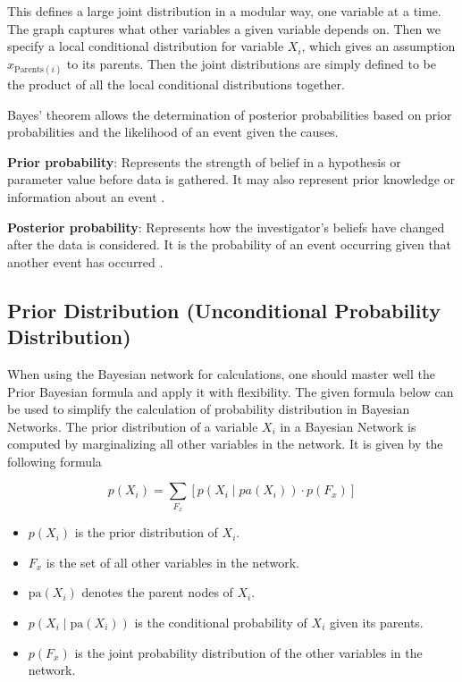 This defines a large joint distribution in a modular way, one variable at a time. The graph captures what other variables a given variable depends on. Then we specify a local conditional distribution for variable \( X_i \), which gives an assumption \( x_{\text{Parents}(i)} \) to its parents. Then the joint distributions are simply defined to be the product of all the local conditional distributions together. 

Bayes’ theorem allows the determination of posterior probabilities based on prior probabilities and the likelihood of an event given the causes.

\textbf{Prior probability}: Represents the strength of belief in a hypothesis or parameter value before data is gathered. It may also represent prior knowledge or information about an event \parencite{mikkola2024prior}.

\textbf{Posterior probability}: Represents how the investigator’s beliefs have changed after the data is considered. It is the probability of an event occurring given that another event has occurred \parencite{hart2022posterior}.

\subsection{Prior Distribution (Unconditional Probability Distribution) }
When using the Bayesian network for calculations, one should master well the Prior Bayesian formula and apply it with flexibility. The given formula below can be used to simplify the calculation of probability distribution in Bayesian Networks. The prior distribution of a variable \(X_i\) in a Bayesian Network is computed by marginalizing all other variables in the network. It is given by the following formula

\begin{equation}
p(X_i)=\sum_{F_x} \left[ p(X_i \mid pa(X_i)) \cdot p(F_x) \right]
\end{equation}
\begin{itemize}
    \item \( p(X_i) \) is the prior distribution of \( X_i \).
    \item \( F_x \) is the set of all other variables in the network.
    \item \( \text{pa}(X_i) \) denotes the parent nodes of \( X_i \).
    \item \( p(X_i \mid \text{pa}(X_i)) \) is the conditional probability of \( X_i \) given its parents.
    \item \( p(F_x) \) is the joint probability distribution of the other variables in the network.
\end{itemize}

